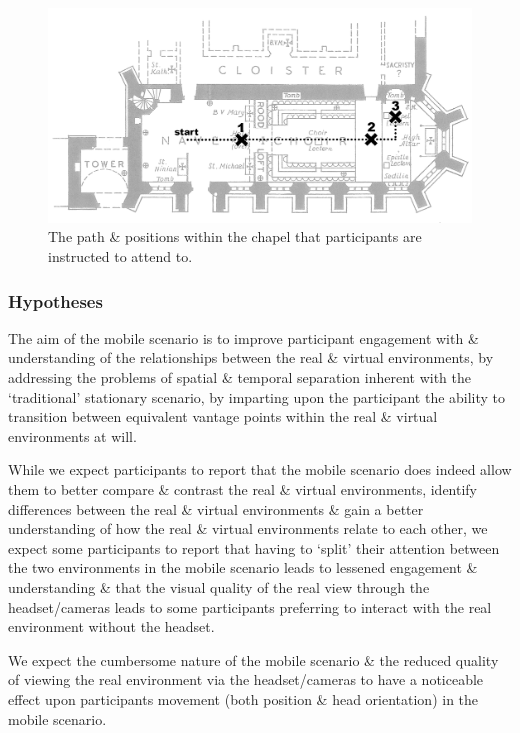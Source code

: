 \begin{figure}[h]
	\begin{center}
		\includegraphics[width=\linewidth]{images/chapel_path.png}
		\caption{The path \& positions within the chapel that participants are instructed to attend to.}
		\label{chapel_path}
	\end{center}
\end{figure}

\subsubsection{Hypotheses}
The aim of the mobile scenario is to improve participant engagement with \& understanding of the relationships between the real \& virtual environments, by addressing the problems of spatial \& temporal separation inherent with the `traditional' stationary scenario, by imparting upon the participant the ability to transition between equivalent vantage points within the real \& virtual environments at will.

While we expect participants to report that the mobile scenario does indeed allow them to better compare \& contrast the real \& virtual environments, identify differences between the real \& virtual environments \& gain a better understanding of how the real \& virtual environments relate to each other, we expect some participants to report that having to `split' their attention between the two environments in the mobile scenario leads to lessened engagement \& understanding \& that the visual quality of the real view through the headset/cameras leads to some participants preferring to interact with the real environment without the headset.

We expect the cumbersome nature of the mobile scenario \& the reduced quality of viewing the real environment via the headset/cameras to have a noticeable effect upon participants movement (both position \& head orientation) in the mobile scenario.

